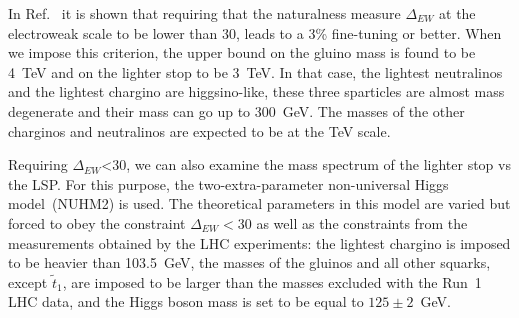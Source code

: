 

In Ref.~\cite{Baer:2016bwh} it is shown that requiring that the naturalness measure $\Delta_{EW}$ at the electroweak scale to be lower than 30, leads to a 3\% fine-tuning or better. When we impose this criterion, the upper bound on the  gluino mass is found to be 4~TeV and on the lighter stop to be 3~TeV. In that case, the lightest neutralinos and the lightest chargino are higgsino-like, these three sparticles are almost mass degenerate and their mass can go up to 300~GeV. The masses of the other charginos and neutralinos are expected to be at the TeV scale.

Requiring $\Delta_{EW}$<30, we can also examine the mass spectrum of the lighter stop vs the LSP. For this purpose, the two-extra-parameter non-universal Higgs model~(NUHM2) \cite{Matalliotakis:1994ft, Baer:2005bu} is used. The theoretical parameters in this model are varied but forced to obey the constraint $\Delta_{EW} <30$ as well as the constraints from the measurements obtained by the LHC experiments: the lightest chargino is imposed to be heavier than 103.5~GeV, the masses of the gluinos and all other squarks,  except $\tilde{t}_{1}$, are imposed to be  larger than the masses excluded with the Run~1 LHC data, and the Higgs boson mass is set to be equal to $125 \pm 2$~GeV. 

